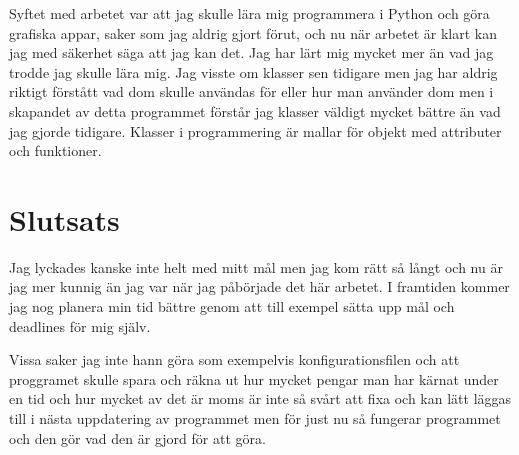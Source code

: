 \documentclass[a4paper, 12pt]{article}
\begin{document}
Syftet med arbetet var att jag skulle lära mig programmera i Python och göra grafiska appar, saker som jag aldrig gjort förut, och nu när arbetet är klart kan jag med säkerhet säga att jag kan det. Jag har lärt mig mycket mer än vad jag trodde jag skulle lära mig. Jag visste om klasser sen tidigare men jag har aldrig riktigt förstått vad dom skulle användas för eller hur man använder dom men i skapandet av detta programmet förstår jag klasser väldigt mycket bättre än vad jag gjorde tidigare. Klasser i programmering är mallar för objekt med attributer och funktioner.


\section{Slutsats}

Jag lyckades kanske inte helt med mitt mål men jag kom rätt så långt och nu är jag mer kunnig än jag var när jag påbörjade det här arbetet.
I framtiden kommer jag nog planera min tid bättre genom att till exempel sätta upp mål och deadlines för mig själv.

Vissa saker jag inte hann göra som exempelvis konfigurationsfilen och att proggramet skulle spara och räkna ut hur mycket pengar man har kärnat under en tid och hur mycket av det är moms är inte så svårt att fixa och kan lätt läggas till i nästa uppdatering av programmet men för just nu så fungerar programmet och den gör vad den är gjord för att göra.


\newpage 

%

\printbibliography
\end{document}
